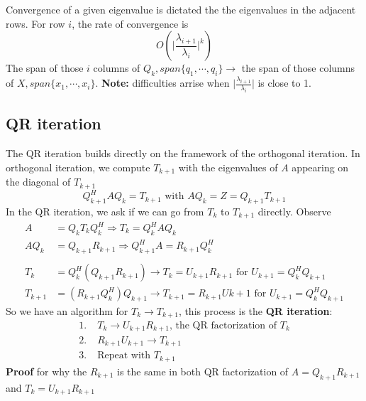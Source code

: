 \documentclass{article}
\newcommand{\abs}[1]{\lvert#1\rvert}
\begin{document}
Convergence of a given eigenvalue is dictated the the eigenvalues in the adjacent rows. For row $i$, the rate of convergence is
\begin{equation*}
    O(\abs{\frac{\lambda_{i+1}}{\lambda_i}}^k)
\end{equation*}
The span of those $i$ columns of $Q_k, span\{q_1, \cdots, q_i\} \longrightarrow$ the span of those columns of $X, span \{x_1, \cdots, x_i\}$. \textbf{Note:} difficulties arrise when $\abs{\frac{\lambda_{i+1}}{\lambda_i}}$ is close to 1.

\subsection{QR iteration}
The QR iteration builds directly on the framework of the orthogonal iteration. In orthogonal iteration, we compute $T_{k+1}$ with the eigenvalues of $A$ appearing on the diagonal of $T_{k+1}$
\begin{equation*}
    Q_{k+1}^HAQ_k = T_{k+1} \textrm{ with }AQ_k = Z = Q_{k+1}T_{k+1}
\end{equation*} 
In the QR iteration, we ask if we can go from $T_k$ to $T_{k+1}$ directly. Observe
\begin{align*}
    A &= Q_k T_k Q_k^H \Longrightarrow T_k = Q_k^HAQ_k\\
    AQ_k &= Q_{k+1}R_{k+1} \Longrightarrow Q_{k+1}^HA = R_{k+1}Q_k^H\\ \\
    T_k &= Q_k^H(Q_{k+1}R_{k+1}) \longrightarrow T_k = U_{k+1} R_{k+1} \textrm{ for } U_{k+1} = Q_k^HQ_{k+1}\\
    T_{k+1} &= (R_{k+1}Q_k^H)Q_{k+1} \longrightarrow T_{k+1} = R_{k+1}U{k+1} \textrm{ for } U_{k+1} = Q_k^HQ_{k+1}
\end{align*} 
So we have an algorithm for $T_k \rightarrow T_{k+1}$, this process is the \textbf{QR iteration}:
\begin{align*}
    1. \;& T_k \longrightarrow U_{k+1}R_{k+1} \textrm{, the QR factorization of } T_k\\
    2. \;&R_{k+1}U_{k+1} \longrightarrow T_{k+1}\\
    3. \;&\textrm{Repeat with } T_{k+1}
\end{align*}
\textbf{Proof} for why the $R_{k+1}$ is the same in both QR factorization of $A = Q_{k+1}R_{k+1}$ and $T_k = U_{k+1}R_{k+1}$
\end{document}
